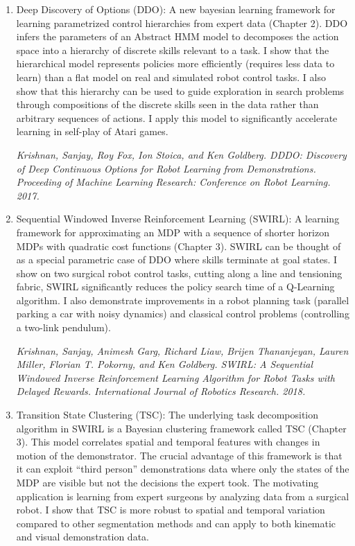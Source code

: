 \begin{enumerate}
    \item Deep Discovery of Options (DDO): A new bayesian learning framework for learning parametrized control hierarchies from expert data (Chapter 2). DDO infers the parameters of an Abstract HMM model to decomposes the action space into a hierarchy of discrete skills relevant to a task. I show that the hierarchical model represents policies more efficiently (requires less data to learn) than a flat model on real and simulated robot control tasks. I also show that this hierarchy can be used to guide exploration in search problems through compositions of the discrete skills seen in the data rather than arbitrary sequences of actions. I apply this model to significantly accelerate learning in self-play of Atari games.

    \emph{Krishnan, Sanjay, Roy Fox, Ion Stoica, and Ken Goldberg. DDDO: Discovery of Deep Continuous Options for Robot Learning from Demonstrations. Proceeding of Machine Learning Research: Conference on Robot Learning. 2017.} 
    
    \item Sequential Windowed Inverse Reinforcement Learning (SWIRL): A learning framework for approximating an MDP with a sequence of shorter horizon MDPs with quadratic cost functions (Chapter 3). SWIRL can be thought of as a special parametric case of DDO where skills terminate at goal states. I show on two surgical robot control tasks, cutting along a line and tensioning fabric, SWIRL significantly reduces the policy search time of a Q-Learning algorithm. I also demonstrate improvements in a robot planning task (parallel parking a car with noisy dynamics) and classical control problems (controlling a two-link pendulum).

    \emph{Krishnan, Sanjay, Animesh Garg, Richard Liaw, Brijen Thananjeyan, Lauren Miller, Florian T. Pokorny, and Ken Goldberg. SWIRL: A Sequential Windowed Inverse Reinforcement Learning Algorithm for Robot Tasks with Delayed Rewards. International Journal of Robotics Research. 2018.}

    \item Transition State Clustering (TSC): The underlying task decomposition algorithm in SWIRL is a Bayesian clustering framework called TSC (Chapter 3). This model correlates spatial and temporal features with changes in motion of the demonstrator. The crucial advantage of this framework is that it can exploit ``third person'' demonstrations data where only the states of the MDP are visible but not the decisions the expert took. The motivating application is learning from expert surgeons by analyzing data from a surgical robot. I show that TSC is more robust to spatial and temporal variation compared to other segmentation methods and can apply to both kinematic and visual demonstration data.


\end{enumerate}
